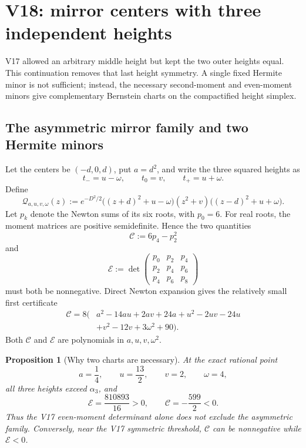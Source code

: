 \documentclass[11pt]{article}
\newtheorem{proposition}[theorem]{Proposition}
\theoremstyle{definition}
\theoremstyle{remark}
\begin{document}

\section{V18: mirror centers with three independent heights}

V17 allowed an arbitrary middle height but kept the two outer heights equal.
This continuation removes that last height symmetry.  A single fixed
Hermite minor is not sufficient; instead, the necessary second-moment and
even-moment minors give complementary Bernstein charts on the compactified
height simplex.

\subsection{The asymmetric mirror family and two Hermite minors}

Let the centers be \((-d,0,d)\), put \(a=d^2\), and write the three squared
heights as
\[
 t_-=u-\omega,\qquad t_0=v,\qquad t_+=u+\omega.
 \tag{N18.1}
\]
Define
\[
 \mathcal Q_{a,u,v,\omega}(z):=
 e^{-D^2/2}
 \bigl((z+d)^2+u-\omega\bigr)(z^2+v)
 \bigl((z-d)^2+u+\omega\bigr).
 \tag{N18.2}
\]
Let \(p_k\) denote the Newton sums of its six roots, with \(p_0=6\).
For real roots, the moment matrices are positive semidefinite.  Hence the
two quantities
\[
 \mathcal C:=6p_4-p_2^2
 \tag{N18.3}
\]
and
\[
 \mathcal E:=
 \det\!\begin{pmatrix}
 p_0&p_2&p_4\\
 p_2&p_4&p_6\\
 p_4&p_6&p_8
 \end{pmatrix}
 \tag{N18.4}
\]
must both be nonnegative.  Direct Newton expansion gives the relatively
small first certificate
\[
\begin{aligned}
 \mathcal C=8\bigl(&a^2-14au+2av+24a+u^2-2uv-24u\\
                   &+v^2-12v+3\omega^2+90\bigr).
\end{aligned}
\tag{N18.5}
\]
Both \(\mathcal C\) and \(\mathcal E\) are polynomials in
\(a,u,v,\omega^2\).

\begin{proposition}[Why two charts are necessary]
\label{prop:f2v18-two-charts}
At the exact rational point
\[
 a=\frac14,\qquad u=\frac{13}{2},\qquad v=2,\qquad\omega=4,
 \tag{N18.6}
\]
all three heights exceed \(\alpha_3\), and
\[
 \mathcal E=\frac{810893}{16}>0,
 \qquad
 \mathcal C=-\frac{599}{2}<0.
 \tag{N18.7}
\]
Thus the V17 even-moment determinant alone does not exclude the asymmetric
family.  Conversely, near the V17 symmetric threshold,
\(\mathcal C\) can be nonnegative while \(\mathcal E<0\).
\end{proposition}
\end{document}
